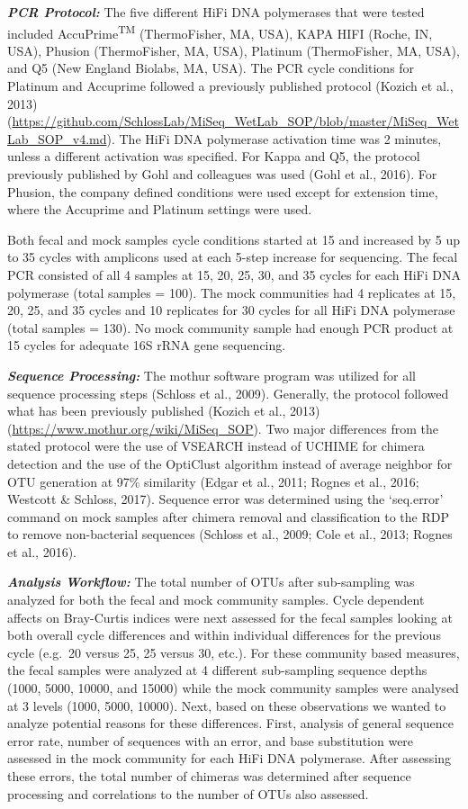 \documentclass[12pt,]{article}
\begin{document}
\textbf{\emph{PCR Protocol:}} The five different HiFi DNA polymerases
that were tested included AccuPrime\textsuperscript{TM} (ThermoFisher,
MA, USA), KAPA HIFI (Roche, IN, USA), Phusion (ThermoFisher, MA, USA),
Platinum (ThermoFisher, MA, USA), and Q5 (New England Biolabs, MA, USA).
The PCR cycle conditions for Platinum and Accuprime followed a
previously published protocol (Kozich et al., 2013)
(\url{https://github.com/SchlossLab/MiSeq_WetLab_SOP/blob/master/MiSeq_WetLab_SOP_v4.md}).
The HiFi DNA polymerase activation time was 2 minutes, unless a
different activation was specified. For Kappa and Q5, the protocol
previously published by Gohl and colleagues was used (Gohl et al.,
2016). For Phusion, the company defined conditions were used except for
extension time, where the Accuprime and Platinum settings were used.

Both fecal and mock samples cycle conditions started at 15 and increased
by 5 up to 35 cycles with amplicons used at each 5-step increase for
sequencing. The fecal PCR consisted of all 4 samples at 15, 20, 25, 30,
and 35 cycles for each HiFi DNA polymerase (total samples = 100). The
mock communities had 4 replicates at 15, 20, 25, and 35 cycles and 10
replicates for 30 cycles for all HiFi DNA polymerase (total samples =
130). No mock community sample had enough PCR product at 15 cycles for
adequate 16S rRNA gene sequencing.

\textbf{\emph{Sequence Processing:}} The mothur software program was
utilized for all sequence processing steps (Schloss et al., 2009).
Generally, the protocol followed what has been previously published
(Kozich et al., 2013) (\url{https://www.mothur.org/wiki/MiSeq_SOP}). Two
major differences from the stated protocol were the use of VSEARCH
instead of UCHIME for chimera detection and the use of the OptiClust
algorithm instead of average neighbor for OTU generation at 97\%
similarity (Edgar et al., 2011; Rognes et al., 2016; Westcott \&
Schloss, 2017). Sequence error was determined using the `seq.error'
command on mock samples after chimera removal and classification to the
RDP to remove non-bacterial sequences (Schloss et al., 2009; Cole et
al., 2013; Rognes et al., 2016).

\textbf{\emph{Analysis Workflow:}} The total number of OTUs after
sub-sampling was analyzed for both the fecal and mock community samples.
Cycle dependent affects on Bray-Curtis indices were next assessed for
the fecal samples looking at both overall cycle differences and within
individual differences for the previous cycle (e.g.~20 versus 25, 25
versus 30, etc.). For these community based measures, the fecal samples
were analyzed at 4 different sub-sampling sequence depths (1000, 5000,
10000, and 15000) while the mock community samples were analysed at 3
levels (1000, 5000, 10000). Next, based on these observations we wanted
to analyze potential reasons for these differences. First, analysis of
general sequence error rate, number of sequences with an error, and base
substitution were assessed in the mock community for each HiFi DNA
polymerase. After assessing these errors, the total number of chimeras
was determined after sequence processing and correlations to the number
of OTUs also assessed.
\end{document}
